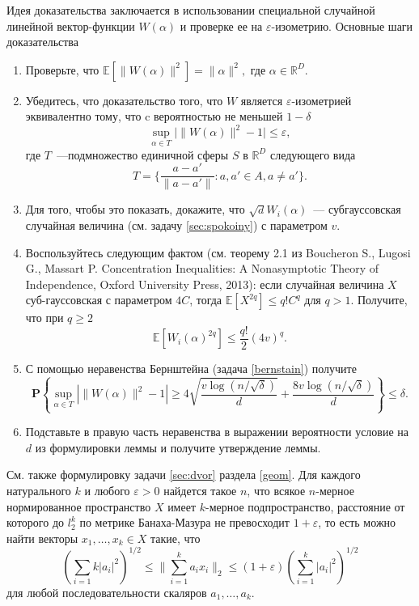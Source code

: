 \begin{ordre}
Идея доказательства заключается в использовании специальной случайной линейной вектор-функции $W(\alpha)$ и проверке ее на $\varepsilon$-изометрию.
Основные шаги доказательства
\begin{enumerate}
\item Проверьте, что $\mathbb{E}[\|W(\alpha)\|^2]= \|\alpha\|^2,$ где $\alpha\in \mathbb{R}^{D}$.
\item Убедитесь, что доказательство того, что $W$ является $\varepsilon$-изометрией эквивалентно тому, что c вероятностью не меньшей $1-\delta$
$$
\sup_{\alpha\in T}\bigl|\|W(\alpha)\|^2-1|\leq\varepsilon,
$$
где  $T$~---подмножество единичной сферы $S$ в $\mathbb{R}^D$ следующего вида
$$
T = \biggl\{ \frac{a-a'}{\|a-a'\|}:a,a'\in A, a\not = a'\biggr\}.
$$
\item Для того, чтобы это показать, докажите, что $\sqrt{d}W_i(\alpha)$~--- субгауссовская случайная величина (см. задачу \ref{sec:spokoiny}) с параметром $v$. 
\item Воспользуйтесь следующим фактом (см. теорему 2.1 из Boucheron S., Lugosi G., Massart P. Concentration Inequalities: A Nonasymptotic Theory of Independence, Oxford University Press, 2013): если случайная величина $X$ суб-гауссовская с параметром $4C$, тогда $\mathbb{E}[X^{2q}]\leq q!C^q$ для $q>1$.
Получите, что при $q\geq 2$
$$
\mathbb{E}[W_i(\alpha)^{2q}]\leq \frac{q!}{2}(4v)^q.
$$
\item С помощью неравенства Бернштейна (задача \ref{bernstain})  получите 
$$
\mathbf{P}\left\{\sup_{\alpha\in T}|\|W(\alpha)\|^2-1|\geq 4\sqrt{\frac{v\log(n/\sqrt{\delta})}{d}}+\frac{8v\log(n/\sqrt{\delta})}{d} \right\}\leq\delta.
$$
\item Подставьте в правую часть неравенства в выражении вероятности условие на $d$ из формулировки леммы и получите утверждение леммы.

\end{enumerate}
\end{ordre}
\begin{problem}
См. также формулировку задачи \ref{sec:dvor} раздела \ref{geom}. 
Для каждого натурального $k$ и любого $\varepsilon>0$ найдется такое $n$, что всякое $n$-мерное нормированное пространство $X$ имеет $k$-мерное подпространство, расстояние от которого до $l_2^k$ по метрике Банаха-Мазура не превосходит $1+\varepsilon$, то есть можно найти векторы $x_1,\dots,x_k\in X$ такие, что 
$$
\left(\sum_{i=1}{k}|a_i|^2\right)^{1/2}\leq \|\sum_{i=1}^ka_ix_i\|_2\leq (1+\varepsilon)\left(\sum_{i=1}^k|a_i|^2\right)^{1/2} 
$$
для любой последовательности скаляров $a_1,\dots,a_k$.
\end{problem}

